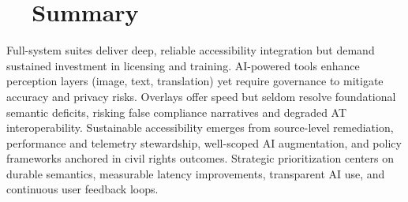 \section{~~Summary}
\label{sec:ch28-summary}
Full-system suites deliver deep, reliable accessibility integration but demand sustained investment in licensing and training. AI-powered tools enhance perception layers (image, text, translation) yet require governance to mitigate accuracy and privacy risks. Overlays offer speed but seldom resolve foundational semantic deficits, risking false compliance narratives and degraded AT interoperability. Sustainable accessibility emerges from source-level remediation, performance and telemetry stewardship, well-scoped AI augmentation, and policy frameworks anchored in civil rights outcomes. Strategic prioritization centers on durable semantics, measurable latency improvements, transparent AI use, and continuous user feedback loops.

